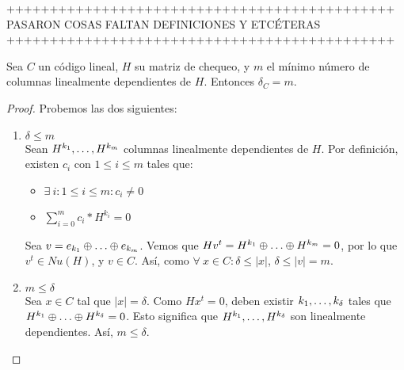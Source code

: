 +++++++++++++++++++++++++++++++++++++++++++++\\
PASARON COSAS FALTAN DEFINICIONES Y ETCÉTERAS\\
+++++++++++++++++++++++++++++++++++++++++++++\\

\begin{theorem}
Sea $C$ un código lineal, $H$ su matriz de chequeo, y $m$ el mínimo número de columnas linealmente dependientes de $H$. Entonces $\delta_C = m$.
\end{theorem}

\begin{proof}
Probemos las dos siguientes:
\begin{enumerate}
\item $\delta \le m$\\
Sean $H^{k_1}, \mathellipsis, H^{k_m}$ columnas linealmente dependientes de $H$. Por definición, existen $c_i$ con $1 \le i \le m$ tales que:
\begin{itemize}
    \item $\exists~ i : 1 \le i \le m : c_i \neq 0$
    \item $\sum_{i=0}^m c_i * H^{k_i} = 0$
\end{itemize}
Sea $v = e_{k_1} \oplus \mathellipsis \oplus e_{k_m}$. Vemos que $Hv^t = H^{k_1} \oplus \mathellipsis \oplus H^{k_m} = 0$, por lo que $v^t \in Nu(H)$, y $v \in C$. Así, como $\forall~ x \in C : \delta \le \left| x \right|$, $\delta \le \left| v \right| = m$.

\item $m \le \delta$\\
Sea $x \in C$ tal que $\left| x \right| = \delta$. Como $Hx^t = 0$, deben existir $k_1, \mathellipsis, k_\delta$ tales que $H^{k_1} \oplus \mathellipsis \oplus H^{k_\delta} = 0$. Esto significa que $H^{k_1}, \mathellipsis, H^{k_\delta}$ son linealmente dependientes. Así, $m \le \delta$.
\end{enumerate} 
\end{proof}

